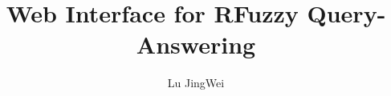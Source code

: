 \documentclass{article}
\begin{document}
\title{Web Interface for RFuzzy Query-Answering}
\author{Lu JingWei}

\maketitle






\newpage
\nocite{*}


\end{document}
